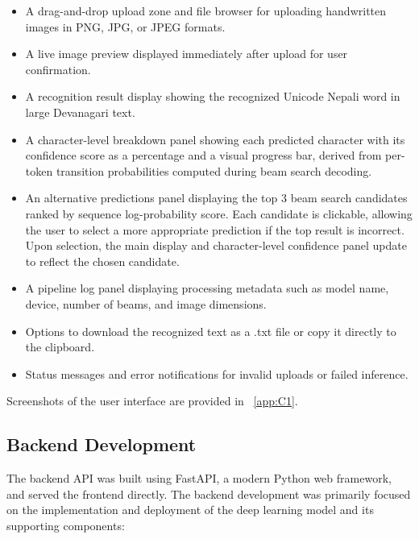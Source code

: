 \begin{itemize}
    \item A drag-and-drop upload zone and file browser for uploading 
    handwritten images in PNG, JPG, or JPEG formats.
    
    \item A live image preview displayed immediately after upload for user 
    confirmation.
    
    \item A recognition result display showing the recognized Unicode Nepali 
    word in large Devanagari text.
    
    \item A character-level breakdown panel showing each predicted character 
    with its confidence score as a percentage and a visual progress bar, 
    derived from per-token transition probabilities computed during beam 
    search decoding.
    
    \item An alternative predictions panel displaying the top 3 beam search 
    candidates ranked by sequence log-probability score. Each candidate is 
    clickable, allowing the user to select a more appropriate prediction if 
    the top result is incorrect. Upon selection, the main display and 
    character-level confidence panel update to reflect the chosen candidate.
    
    \item A pipeline log panel displaying processing metadata such as model 
    name, device, number of beams, and image dimensions.
    
    \item Options to download the recognized text as a .txt file 
    or copy it directly to the clipboard.
    
    \item Status messages and error notifications for invalid uploads or 
    failed inference.
\end{itemize}
\noindent Screenshots of the user interface are provided in \Appendices~\ref{app:C1}.

\subsection{Backend Development}
The backend API was built using FastAPI, a modern Python web framework, and 
served the frontend directly. The backend development was primarily focused 
on the implementation and deployment of the deep learning model and its 
supporting components:

